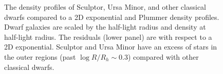 \begin{figure}
\centering
{}
\caption[Classical dwarf density profiles]{The density profiles of
Sculptor, Ursa Minor, and other classical dwarfs compared to a 2D
exponential and Plummer density profiles. Dwarf galaxies are scaled by
the half-light radius and density at half-light radius. The residuals
(lower panel) are with respect to a 2D exponential. Sculptor and Ursa
Minor have an excess of stars in the outer regions (past
\(\log R/R_h \sim 0.3\)) compared with other classical
dwarfs.}\label{fig:classical_dwarfs_densities}
\end{figure}
